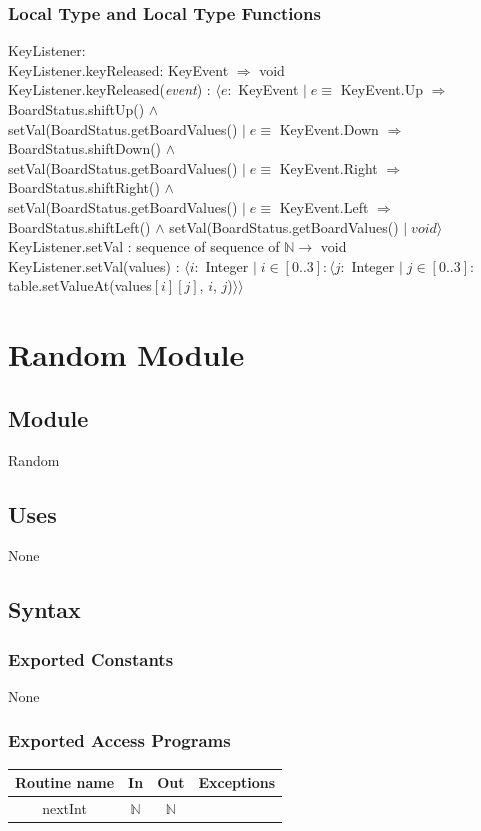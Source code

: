 \documentclass{article}
\begin{document}
\subsubsection*{Local Type and Local Type Functions}
KeyListener:\\
KeyListener.keyReleased: KeyEvent $\Rightarrow$ void\\
KeyListener.keyReleased(\textit{event}) : $\langle e :$ KeyEvent $|\;e \equiv$ KeyEvent.Up $\Rightarrow $ BoardStatus.shiftUp() $\land$ \\ setVal(BoardStatus.getBoardValues() $ |\; e \equiv$ KeyEvent.Down $\Rightarrow $ BoardStatus.shiftDown() $\land$ \\ setVal(BoardStatus.getBoardValues() $|\;e \equiv$ KeyEvent.Right $\Rightarrow $ BoardStatus.shiftRight() $\land$ \\ setVal(BoardStatus.getBoardValues() $| \;e \equiv$ KeyEvent.Left $\Rightarrow $ BoardStatus.shiftLeft() $\land$ setVal(BoardStatus.getBoardValues() $| \; void \rangle$ \\
KeyListener.setVal : sequence of sequence of $\mathbb{N} \rightarrow $ void\\
KeyListener.setVal(values) : $\langle i :$ Integer $ |\; i \in [0..3] : \langle j : $ Integer $ |\; j \in [0..3]:$ table.setValueAt(values$[i][j]$, $i$, $j$)$\rangle \rangle$\\


\newpage
\section*{Random Module}
\subsection*{Module}
Random
\subsection*{Uses}
None

\subsection*{Syntax}
\subsubsection*{Exported Constants}
None
\subsubsection*{Exported Access Programs}
\begin{tabular}{ | c | c | c | c | }
        \hline 
    
          \textbf{Routine name} & \textbf{In} & \textbf{Out} & \textbf{Exceptions}\\
          \hline 
          nextInt &$\mathbb{N}$ & $\mathbb{N}$ & \\\hline
          
          
          
         
\end{tabular}
\end{document}
